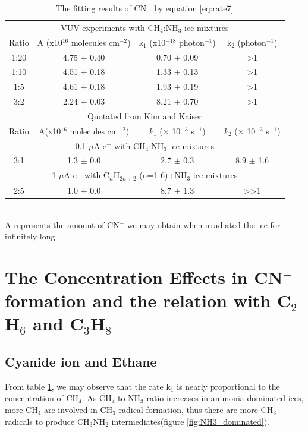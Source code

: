 \begin{table}[htbp]
\caption{The fitting results of CN$^-$ by equation \ref{eq:rate7}}
\label{tab:CNrate}
\begin{tabular}{cccc}
\hline
\hline
\multicolumn{4}{c}{VUV experiments with CH$_4$:NH$_3$ ice mixtures}\\
Ratio & A (x10$^{16}$ molecules cm$^{-2}$) & k$_1$ (x10$^{-18}$ photon$^{-1}$) & k$_2$ (photon$^{-1}$)\\
\hline
1:20 & 4.75 $\pm$ 0.40 & 0.70 $\pm$ 0.09 & >1 \\
1:10 & 4.51 $\pm$ 0.18 & 1.33 $\pm$ 0.13 & >1 \\
1:5 & 4.61 $\pm$ 0.18 & 1.93 $\pm$ 0.19 & >1 \\
3:2 & 2.24 $\pm$ 0.03 & 8.21 $\pm$ 0.70 & >1 \\
\hline
\hline
\multicolumn{4}{c}{Quotated from Kim and Kaiser\cite{kim}} \\
Ratio & A(x10$^{16}$ molecules cm$^{-2}$) & $k_1$ ($\times$ 10$^{-3}$ s$^{-1}$) &  $k_2$  ($\times$ 10$^{-3}$ s$^{-1}$)\\
\hline
\multicolumn{4}{c}{0.1 $\mu$A e$^-$ with CH$_4$:NH$_3$ ice mixtures}\\
3:1 & 1.3 $\pm$ 0.0 & 2.7 $\pm$ 0.3 & 8.9 $\pm$ 1.6 \\
\hline
\multicolumn{4}{c}{1 $\mu$A e$^-$ with C$_n$H$_{2n+2}$ (n=1-6)+NH$_3$ ice mixtures}\\
2:5 & 1.0 $\pm$ 0.0 & 8.7 $\pm$ 1.3 & >>1 \\
\hline
\end{tabular}\\
A represents the amount of CN$^-$ we may obtain when irradiated the ice for infinitely long.\
\end{table}

\section{The Concentration Effects in CN$^-$formation and the relation with C$_2$H$_6$ and C$_3$H$_8$}



\subsection{Cyanide ion and Ethane}

From table \ref{tab:CNrate}, we may observe that the rate k$_1$ is nearly proportional to the concentration of CH$_4$.  As CH$_4$ to NH$_3$ ratio increases in ammonia dominated ices, more CH$_4$ are involved in CH$_3$ radical formation, thus there are more CH$_3$ radicals to produce CH$_3$NH$_2$ intermediates(figure \ref{fig:NH3_dominated}).\\

